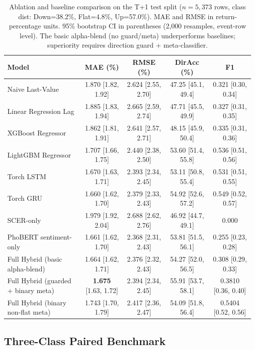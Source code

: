 \documentclass[runningheads]{llncs}
\begin{document}
\begin{table}[htbp]
\centering
\caption{Ablation and baseline comparison on the T+1 test split ($n=5,373$ rows, class dist: Down=38.2\%, Flat=4.8\%, Up=57.0\%). MAE and RMSE in return-percentage units. 95\% bootstrap CI in parentheses (2,000 resamples, event-row level). The basic alpha-blend (no guard/meta) underperforms baselines; superiority requires direction guard + meta-classifier.}
\label{tabablation}
\begin{tabular}{lcccc}
\toprule
Model & MAE (\%) & RMSE (\%) & DirAcc (\%) & F1 \\
\midrule
Naive Last-Value & 1.870 [1.82, 1.92] & 2.624 [2.55, 2.70] & 47.25 [45.1, 49.4] & 0.321 [0.30, 0.34] \\
Linear Regression Lag & 1.885 [1.83, 1.94] & 2.665 [2.59, 2.74] & 47.71 [45.5, 49.9] & 0.327 [0.31, 0.35] \\
XGBoost Regressor & 1.862 [1.81, 1.91] & 2.641 [2.57, 2.71] & 48.15 [45.9, 50.4] & 0.335 [0.31, 0.36] \\
LightGBM Regressor & 1.707 [1.66, 1.75] & 2.440 [2.38, 2.50] & 53.60 [51.4, 55.8] & 0.536 [0.51, 0.56] \\
Torch LSTM & 1.670 [1.63, 1.71] & 2.393 [2.34, 2.45] & 53.11 [50.8, 55.4] & 0.531 [0.51, 0.55] \\
Torch GRU & 1.660 [1.62, 1.70] & 2.379 [2.33, 2.43] & 54.92 [52.6, 57.2] & 0.549 [0.52, 0.57] \\
SCER-only & 1.979 [1.92, 2.04] & 2.688 [2.62, 2.76] & 46.92 [44.7, 49.1] & 0.000 \\
PhoBERT sentiment-only & 1.661 [1.62, 1.70] & 2.368 [2.31, 2.43] & 53.81 [51.5, 56.1] & 0.255 [0.23, 0.28] \\
\midrule
Full Hybrid (basic alpha-blend) & 1.664 [1.62, 1.71] & 2.376 [2.32, 2.43] & 54.27 [52.0, 56.5] & 0.308 [0.29, 0.33] \\
Full Hybrid (guarded + binary meta) & \textbf{1.675} [1.63, 1.72] & 2.394 [2.34, 2.45] & 55.91 [53.7, 58.1] & 0.3810 [0.36, 0.40] \\
\midrule
Full Hybrid (binary non-flat meta) & 1.743 [1.70, 1.79] & 2.417 [2.36, 2.47] & 54.09 [51.8, 56.4] & 0.5404 [0.52, 0.56] \\
\bottomrule
\end{tabular}
\end{table}

\subsection{Three-Class Paired Benchmark}
\end{document}
